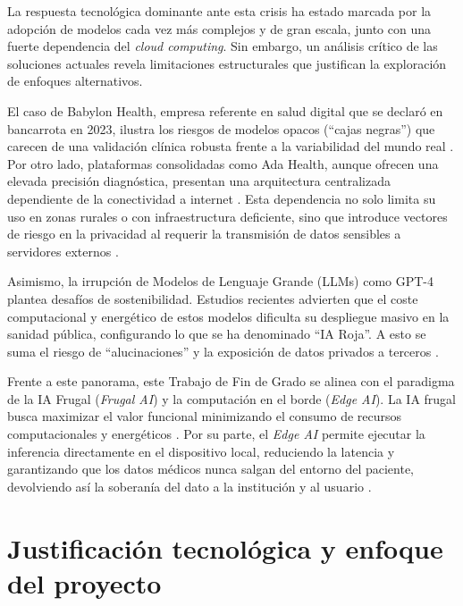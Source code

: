La respuesta tecnológica dominante ante esta crisis ha estado marcada por la adopción de modelos cada vez más complejos y de gran escala, junto con una fuerte dependencia del \textit{cloud computing}. Sin embargo, un análisis crítico de las soluciones actuales revela limitaciones estructurales que justifican la exploración de enfoques alternativos.

El caso de Babylon Health, empresa referente en salud digital que se declaró en bancarrota en 2023, ilustra los riesgos de modelos opacos (``cajas negras'') que carecen de una validación clínica robusta frente a la variabilidad del mundo real \cite{babylonFierce2023,babylonHospitalogy2023}. Por otro lado, plataformas consolidadas como Ada Health, aunque ofrecen una elevada precisión diagnóstica, presentan una arquitectura centralizada dependiente de la conectividad a internet \cite{symptomCheckerAppsPharmaphorum,adaCloneDhiWise}. Esta dependencia no solo limita su uso en zonas rurales o con infraestructura deficiente, sino que introduce vectores de riesgo en la privacidad al requerir la transmisión de datos sensibles a servidores externos \cite{edgeVsCloudClarifai,localVsCloudKonvoy}.

Asimismo, la irrupción de Modelos de Lenguaje Grande (LLMs) como GPT-4 plantea desafíos de sostenibilidad. Estudios recientes advierten que el coste computacional y energético de estos modelos dificulta su despliegue masivo en la sanidad pública, configurando lo que se ha denominado ``IA Roja''. A esto se suma el riesgo de ``alucinaciones'' y la exposición de datos privados a terceros \cite{mdpiLLMHealthcare,oxfordJAMIA2025llmLessEffective,jmirAI2024triageNotes}.

Frente a este panorama, este Trabajo de Fin de Grado se alinea con el paradigma de la IA Frugal (\textit{Frugal AI}) y la computación en el borde (\textit{Edge AI}). La IA frugal busca maximizar el valor funcional minimizando el consumo de recursos computacionales y energéticos \cite{kddFrugalAI,smileFrugalAI}. Por su parte, el \textit{Edge AI} permite ejecutar la inferencia directamente en el dispositivo local, reduciendo la latencia y garantizando que los datos médicos nunca salgan del entorno del paciente, devolviendo así la soberanía del dato a la institución y al usuario \cite{edgeVsCloudClarifai,localVsCloudKonvoy}.

\section{Justificación tecnológica y enfoque del proyecto}

